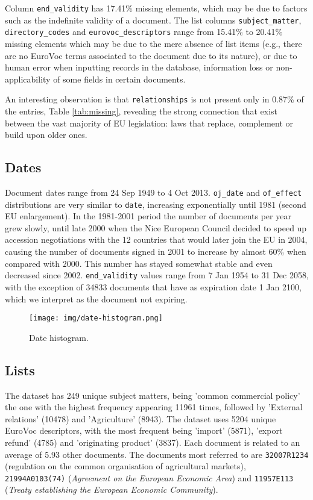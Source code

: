 \documentclass[sigconf, authorversion]{acmart}
\begin{document}
Column \texttt{end\_validity} has 17.41\% missing elements, which may be due to factors such as the indefinite validity of a document. The list columns \texttt{subject\_matter}, \texttt{directory\_codes} and \texttt{eurovoc\_descriptors} range from 15.41\% to 20.41\% missing elements which may be due to the mere absence of list items (e.g., there are no EuroVoc terms associated to the document due to its nature), or due to human error when inputting records in the database, information loss or non-applicability of some fields in certain documents.\par

An interesting observation is that \texttt{relationships} is not present only in 0.87\% of the entries, Table \ref{tab:missing}, revealing the strong connection that exist between the vast majority of EU legislation: laws that replace, complement or build upon older ones.

\subsection{Dates}

Document dates range from 24 Sep 1949 to 4 Oct 2013. \texttt{oj\_date} and \texttt{of\_effect} distributions are very similar to \texttt{date}, increasing exponentially until 1981 (second EU enlargement). In the 1981-2001 period the number of documents per year grew slowly, until late 2000 when the Nice European Council decided to speed up accession negotiations with the 12 countries that would later join the EU in 2004, causing the number of documents signed in 2001 to increase by almost $60\%$ when compared with 2000. 
This number has stayed somewhat stable and even decreased since 2002. \texttt{end\_validity} values range from 7 Jan 1954 to 31 Dec 2058, with the exception of 34833 documents that have as expiration date 1 Jan 2100, which we interpret as the document not expiring.

\begin{figure}[H]
  \texttt{[image: img/date-histogram.png]}
  \caption{Date histogram.}
\end{figure}

\subsection{Lists}

The dataset has 249 unique subject matters, being 'common commercial policy' the one with the highest frequency appearing 11961 times, followed by 'External relations' (10478) and 'Agriculture' (8943).
The dataset uses 5204 unique EuroVoc descriptors, with the most frequent being 'import'  (5871), 'export refund' (4785) and 'originating product' (3837).
Each document is related to an average of 5.93 other documents. The documents most referred to are \texttt{32007R1234} (regulation on the common organisation of agricultural markets), \texttt{21994A0103(74)} (\textit{Agreement on the European Economic Area}) and \texttt{11957E113} (\textit{Treaty establishing the European Economic Community}).
\end{document}
